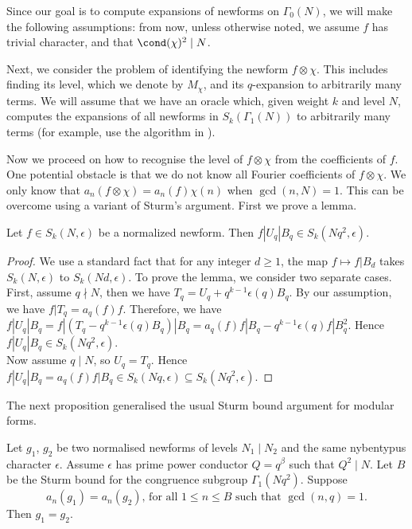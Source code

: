 \documentclass [11pt, proquest] {uwthesis}[2015/03/03]
\begin{document}
Since our goal is to compute expansions of newforms on $\Gamma_0(N)$, we will make the following assumptions: 
from now, unless otherwise noted, we assume $f$ has trivial character, and that $\cond(\chi)^2 \mid N$.


Next, we consider the problem of identifying the newform $f \otimes \chi$. This includes finding its level, which we denote by $M_\chi$, and its $q$-expansion to arbitrarily many terms. We will assume that we have an oracle which, given weight $k$ and level $N$, computes the expansions of all newforms in $S_k(\Gamma_1(N))$ to arbitrarily many terms (for example, use the algorithm in \cite{stein2007modular}).

Now we proceed on how to recognise the level of $f \otimes \chi$ from the coefficients of $f$. One potential obstacle is that we do not know all Fourier coefficients of $f \otimes \chi$. We only know that $a_n(f \otimes \chi)  = a_n(f)\chi(n)$   when $\gcd(n, N) = 1$. This can be overcome using a variant of Sturm's argument. First we prove a lemma.
\begin{Lemma}
Let $f \in S_k(N, \epsilon)$ be a normalized newform. Then $f|U_q|B_q \in S_k(Nq^2, \epsilon)$.
\end{Lemma}

\begin{proof}
We use a standard fact that for any integer $d \geq 1$, the map $f \mapsto f|B_d$ takes $S_k(N, \epsilon)$ to 
$S_k(Nd, \epsilon)$. To prove the lemma, we consider two separate cases. First, assume $q \nmid N$, then we have 
$T_q = U_q + q^{k-1} \epsilon(q) B_q$. By our assumption, we have $f|T_q = a_q(f) f$. Therefore, we have 
$f|U_q|B_q = f|(T_q - q^{k-1} \epsilon(q) B_q)|B_q = a_q(f)f|B_q - q^{k-1} \epsilon(q) f|B_q^2$. Hence $f|U_q|B_q \in S_k(Nq^2, \epsilon)$. \\
Now assume $q \mid N$, so $U_q = T_q$. Hence $f|U_q|B_q = a_q(f) f|B_q \in S_k(Nq, \epsilon) \subseteq  S_k(Nq^2, \epsilon)$. 
\end{proof}

The next proposition generalised the usual Sturm bound argument for modular forms. 

\begin{Prop}
Let $g_1$, $g_2$ be two normalised newforms of levels $N_1 \mid N_2$ and the same nybentypus character $\epsilon$. Assume $\epsilon$ has prime power conductor $Q = q^\beta$ such that  $Q^2 \mid N$. Let 
$B$ be the Sturm bound for the congruence subgroup $\Gamma_1(Nq^2)$. Suppose 
\[
	a_n(g_1) = a_n(g_2), \, \mbox{for all }1 \leq n \leq B \mbox{ such that } \gcd(n,q) = 1.
\]
Then $g_1 = g_2$. 
\end{Prop}
\end{document}
